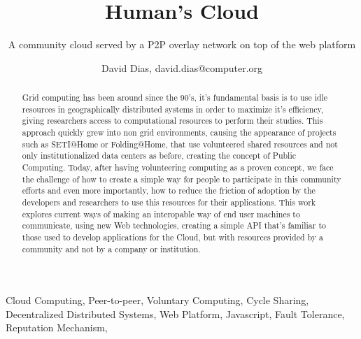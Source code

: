 \documentclass{./llncs2e/llncs}
\begin{document}
\title{Human's Cloud}

\subtitle{A community cloud served by a P2P overlay network on top of the web platform}
\author{David Dias, david.dias@computer.org}

\maketitle



% 
% 

\begin{abstract}
Grid computing has been around since the 90's, it's fundamental basis is to use idle resources in geographically distributed systems in order to maximize it's efficiency, giving researchers access to computational resources to perform their studies. This approach quickly grew into non grid environments, causing the appearance of projects such as SETI@Home or Folding@Home, that use volunteered shared resources and not only institutionalized data centers as before, creating the concept of Public Computing. Today, after having volunteering computing as a proven concept, we face the challenge of how to create a simple way for people to participate in this community efforts and even more importantly, how to reduce the friction of adoption by the developers and researchers to use this resources for their applications. This work explores current ways of making an interopable way of end user machines to communicate, using new Web technologies, creating a simple API that's familiar to those used to develop applications for the Cloud, but with resources provided by a community and not by a company or institution.

\end{abstract}




% 
% 

\begin{keywords}
Cloud Computing, Peer-to-peer, Voluntary Computing, Cycle Sharing, Decentralized Distributed Systems, Web Platform, Javascript, Fault Tolerance, Reputation Mechanism, 
\end{keywords}
\end{document}

